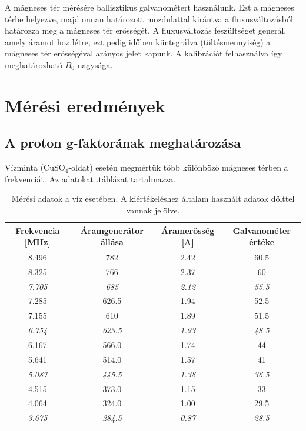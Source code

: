 \documentclass[a4paper,12pt]{article}
\begin{document}
A mágneses tér mérésére ballisztikus galvanométert használunk. Ezt a mágneses térbe helyezve, majd onnan határozott mozdulattal kirántva a fluxusváltozásból határozza meg a mágneses tér erősségét. A fluxusváltozás feszültséget generál, amely áramot hoz létre, ezt pedig időben kiintegrálva (töltésmennyiség) a mágneses tér erősségéval arányos jelet kapunk. A kalibrációt felhasználva így meghatározható $B_0$ nagysága.

\section{Mérési eredmények}

\subsection{A proton g-faktorának meghatározása}

Vízminta (CuSO$_4$-oldat) esetén megmértük több különböző mágneses térben a frekvenciát. Az adatokat .táblázat tartalmazza.

\begin{table}[h]
	\begin{center}
	\begin{tabular}{|c|c|c|c|}
		\hline
		\textbf{Frekvencia [MHz]} & \textbf{Áramgenerátor állása} & \textbf{Áramerősség [A]} & \textbf{Galvanométer értéke} \\
		\hline \hline
		8.496	& 782	&2.42	&60.5 \\  
		\hline
		8.325	&766		&2.37	&60 \\ \hline
		\textit{7.705}	&\textit{685}		&\textit{2.12}	&\textit{55.5} \\ \hline
		7.285	&626.5	&1.94	&52.5 \\ \hline
		7.155	&610		&1.89	&51.5 \\ \hline
		\textit{6.754}	&\textit{623.5}	&\textit{1.93}	&\textit{48.5}	\\ \hline
		6.167	&566.0	&1.74	&44 \\	 \hline
		5.641	&514.0	&1.57	&41 \\ \hline
		\textit{5.087}	&\textit{445.5}	&\textit{1.38}	&\textit{36.5}	 \\ \hline
		4.515	&373.0	&1.15	&33	\\  \hline
		4.064	&324.0	&1.00	&29.5	\\ \hline
		\textit{3.675}	&\textit{284.5}	&\textit{0.87}	&\textit{28.5}	 \\ \hline
	\end{tabular}
	\end{center}
	\caption{Mérési adatok a víz esetében. A kiértékeléshez általam használt adatok dőlttel vannak jelölve.}
	\label{tab:proton_all}
\end{table}
\end{document}
